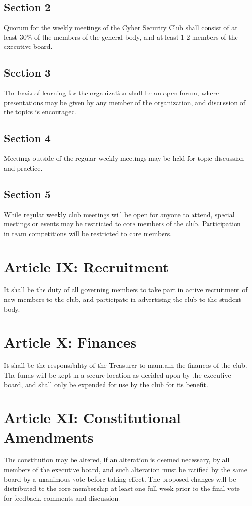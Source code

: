 \documentclass[10pt]{article}
\begin{document}
\subsection*{Section 2}
Quorum for the weekly meetings of the Cyber Security Club shall consist of at least 30\% of the
members of the general body, and at least 1-2 members of the executive board.
\subsection*{Section 3}
The basis of learning for the organization shall be an open forum, where presentations may be given by
any member of the organization, and discussion of the topics is encouraged.
\subsection*{Section 4}
Meetings outside of the regular weekly meetings may be held for topic discussion and practice.
\subsection*{Section 5}
While regular weekly club meetings will be open for anyone to attend, special meetings or events may
be restricted to core members of the club. Participation in team competitions will be restricted to core
members.
\vspace{0.2in}

\section*{Article IX: Recruitment}
It shall be the duty of all governing members to take part in active recruitment of new members to the
club, and participate in advertising the club to the student body.
\vspace{0.2in}

\section*{Article X: Finances}
It shall be the responsibility of the Treasurer to maintain the finances of the club. The funds will be kept
in a secure location as decided upon by the executive board, and shall only be expended for use by the
club for its benefit.
\vspace{0.2in}

\section*{Article XI: Constitutional Amendments}
The constitution may be altered, if an alteration is deemed necessary, by all members of the executive
board, and such alteration must be ratified by the same board by a unanimous vote before taking effect.
The proposed changes will be distributed to the core membership at least one full week prior to the
final vote for feedback, comments and discussion.
\end{document}

